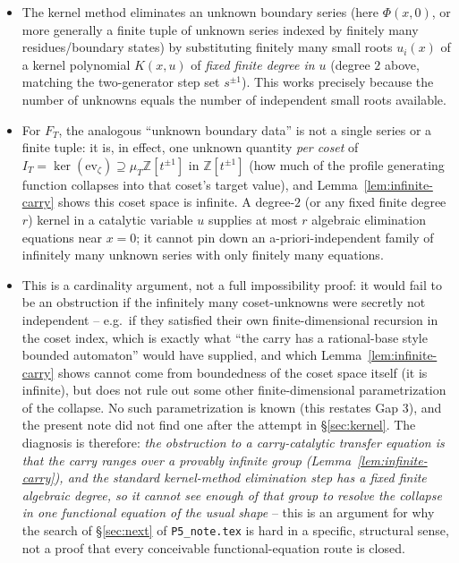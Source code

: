 \documentclass[11pt]{article}
\theoremstyle{remark}
\newcommand{\Z}{\mathbb Z}
\begin{document}
\begin{itemize}
\item The kernel method eliminates an unknown boundary series (here $\Phi(x,0)$, or more generally a
finite tuple of unknown series indexed by finitely many residues/boundary states) by substituting
finitely many small roots $u_i(x)$ of a kernel polynomial $K(x,u)$ of \emph{fixed finite degree in $u$}
(degree $2$ above, matching the two-generator step set $s^{\pm1}$). This works precisely because the
number of unknowns equals the number of independent small roots available.
\item For $F_T$, the analogous ``unknown boundary data'' is not a single series or a finite tuple: it is,
in effect, one unknown quantity \emph{per coset} of $I_T=\ker(\mathrm{ev}_\zeta)\supseteq\mu_T\Z[t^{\pm1}]$
in $\Z[t^{\pm1}]$ (how much of the profile generating function collapses into that coset's target value),
and Lemma~\ref{lem:infinite-carry} shows this coset space is infinite. A degree-$2$ (or any fixed finite
degree $r$) kernel in a catalytic variable $u$ supplies at most $r$ algebraic elimination equations near
$x=0$; it cannot pin down an a-priori-independent family of infinitely many unknown series with only
finitely many equations.
\item This is a cardinality argument, not a full impossibility proof: it would fail to be an obstruction
if the infinitely many coset-unknowns were secretly not independent -- e.g.\ if they satisfied their own
finite-dimensional recursion in the coset index, which is exactly what ``the carry has a rational-base
style bounded automaton'' would have supplied, and which Lemma~\ref{lem:infinite-carry} shows cannot come
from boundedness of the coset space itself (it is infinite), but does not rule out some other
finite-dimensional parametrization of the collapse. No such parametrization is known (this restates
Gap 3), and the present note did not find one after the attempt in \S\ref{sec:kernel}. The diagnosis is
therefore: \emph{the obstruction to a carry-catalytic transfer equation is that the carry ranges over a
provably infinite group (Lemma~\ref{lem:infinite-carry}), and the standard kernel-method elimination step
has a fixed finite algebraic degree, so it cannot see enough of that group to resolve the collapse in one
functional equation of the usual shape} -- this is an argument for why the search of \S\ref{sec:next} of
\texttt{P5\_note.tex} is hard in a specific, structural sense, not a proof that every conceivable
functional-equation route is closed.
\end{itemize}
\end{document}
